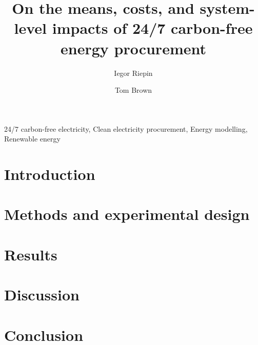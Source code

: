 \documentclass[11pt, 5p, nopreprintline]{elsarticle}
\begin{document}
\begin{frontmatter}

	\title{On the means, costs, and system-level impacts of 24/7 carbon-free energy procurement}
    
	\author[tubaddress]{Iegor Riepin}
	\author[tubaddress]{Tom Brown} 
	
	\address[tubaddress]{Department of Digital Transformation in Energy Systems, TU Berlin, Germany}

	\begin{abstract}
		
	\end{abstract}

	\begin{keyword}
		24/7 carbon-free electricity, 
		Clean electricity procurement, 
		Energy modelling, 
		Renewable energy
	\end{keyword}


\end{frontmatter}

\tableofcontents

\section{Introduction}
\label{sec:intro}


\section{Methods and experimental design}
\label{sec:methods}


\section{Results}
\label{sec:results}


\section{Discussion}
\label{sec:discussion}


\section{Conclusion}
\label{sec:conclusion}

\end{document}
